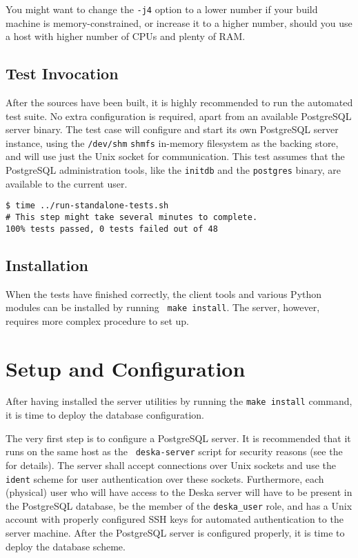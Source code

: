 \documentclass[deska]{subfiles}
\begin{document}
You might want to change the {\tt -j4} option to a lower number if your build machine is memory-constrained, or increase
it to a higher number, should you use a host with higher number of CPUs and plenty of RAM.

\subsection{Test Invocation}

After the sources have been built, it is highly recommended to run the automated test suite.  No extra configuration is
required, apart from an available PostgreSQL server binary.  The test case will configure and start its own PostgreSQL
server instance, using the {\tt /dev/shm} {\tt shmfs} in-memory filesystem as the backing store, and will use just the
Unix socket for communication.  This test assumes that the PostgreSQL administration tools, like the {\tt initdb} and
the {\tt postgres} binary, are available to the current user.

\begin{verbatim}
$ time ../run-standalone-tests.sh
# This step might take several minutes to complete.
100% tests passed, 0 tests failed out of 48
\end{verbatim}

\subsection{Installation}

When the tests have finished correctly, the client tools and various Python modules can be installed by running {\tt
make install}.  The server, however, requires more complex procedure to set up.

\section{Setup and Configuration}
\label{sec:build-server-setup}

After having installed the server utilities by running the {\tt make install} command, it is time to deploy the database
configuration.

The very first step is to configure a PostgreSQL server.  It is recommended that it runs on the same host as the {\tt
deska-server} script for security reasons (see the  for details).  The server shall
accept connections over Unix sockets and use the {\tt ident} scheme for user authentication over these sockets.
Furthermore, each (physical) user who will have access to the Deska server will have to be present in the PostgreSQL
database, be the member of the {\tt deska\_user} role, and has a Unix account with properly configured SSH keys for
automated authentication to the server machine.  After the PostgreSQL server is configured properly, it is time to
deploy the database scheme.
\end{document}

